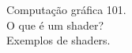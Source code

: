 \documentclass[preview]{standalone}
\begin{document}
Computação gráfica 101.\\O que é um shader?\\Exemplos de shaders.\\
\end{document}
